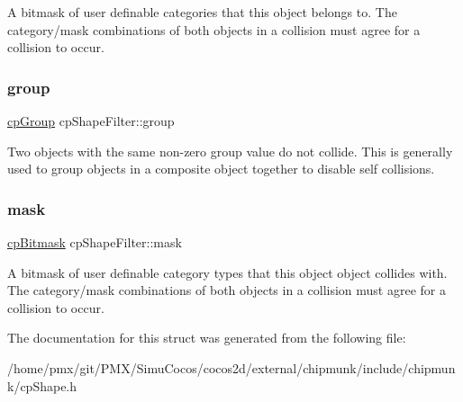 A bitmask of user definable categories that this object belongs to. The category/mask combinations of both objects in a collision must agree for a collision to occur. \mbox{\label{structcpShapeFilter_a6d29bf3cc7f406cdf834465f9de71c21}} 
\subsubsection{\texorpdfstring{group}{group}}
{\footnotesize\ttfamily \hyperlink{group__basicTypes_gacd811b1135a8f4a3e5cc019552b18b1a}{cp\+Group} cp\+Shape\+Filter\+::group}

Two objects with the same non-\/zero group value do not collide. This is generally used to group objects in a composite object together to disable self collisions. \mbox{\label{structcpShapeFilter_a0ee36d60cbc25e1abf18aa1508d7a537}} 
\subsubsection{\texorpdfstring{mask}{mask}}
{\footnotesize\ttfamily \hyperlink{group__basicTypes_gae7ff94f62e00cae288c1991958822743}{cp\+Bitmask} cp\+Shape\+Filter\+::mask}

A bitmask of user definable category types that this object object collides with. The category/mask combinations of both objects in a collision must agree for a collision to occur. 

The documentation for this struct was generated from the following file\+:\begin{DoxyCompactItemize}
\item 
/home/pmx/git/\+P\+M\+X/\+Simu\+Cocos/cocos2d/external/chipmunk/include/chipmunk/cp\+Shape.\+h\end{DoxyCompactItemize}
